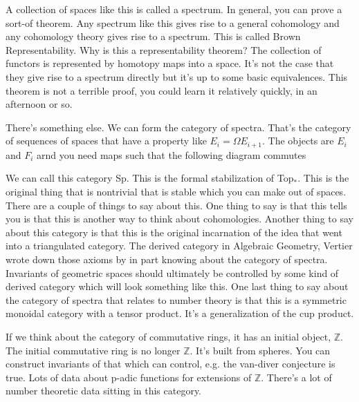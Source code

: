 \documentclass[10pt]{article}
\theoremstyle{definition}
\begin{document}
	A collection of spaces like this is called a spectrum. In general, you can prove a sort-of theorem. Any spectrum like this gives rise to a general cohomology and any cohomology theory gives rise to a spectrum. This is called Brown Representability. Why is this a representability theorem? The collection of functors is represented by homotopy maps into a space. It's not the case that they give rise to a spectrum directly but it's up to some basic equivalences. This theorem is not a terrible proof, you could learn it relatively quickly, in an afternoon or so. 
	
	There's something else. We can form the category of spectra. That's the category of sequences of spaces that have a property like $E_i=\Omega E_{i+1}$. The objects are $E_i$ and $F_i$ arnd you need maps such that the following diagram commutes
	\begin{center}
	\end{center}
	We can call this category \textsf{Sp}. This is the formal stabilization of \textsf{Top}$_\ast$. This is the original thing that is nontrivial that is stable which you can make out of spaces. There are a couple of things to say about this. One thing to say is that this tells you is that this is another way to think about cohomologies. Another thing to say about this category is that this is the original incarnation of the idea that went into a triangulated category. The derived category in Algebraic Geometry, Vertier wrote down those axioms by in part knowing about the category of spectra. Invariants of geometric spaces should ultimately be controlled by some kind of derived category which will look something like this. One last thing to say about the category of spectra that relates to number theory is that this is a symmetric monoidal category with a tensor product. It's a generalization of the cup product. 
	
	If we think about the category of commutative rings, it has an initial object, $\mathbb{Z}$. The initial commutative ring is no longer $\mathbb{Z}$. It's built from spheres. You can construct invariants of that which can control, e.g. the van-diver conjecture is true. Lots of data about p-adic functions for extensions of $\mathbb{Z}$. There's a lot of number theoretic data sitting in this category. 
	
\end{document}
